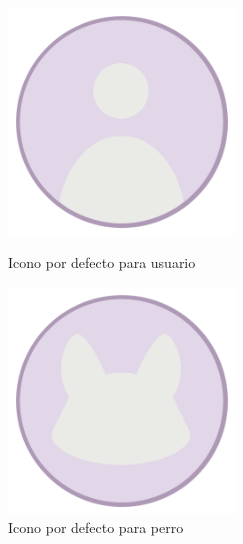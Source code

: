 \documentclass[a4paper, 12pt]{article}
\begin{document}
\begin{figure}[H]
   	\begin{minipage}{0.48\textwidth}
		\begin{center}
			{\includegraphics[width=6cm]{logo/EMPTYUSER.png}\par}
			\caption{Icono por defecto para usuario}
		\end{center}  
	\end{minipage}\hfill
   	\begin{minipage}{0.48\textwidth}
		\begin{center}
			{\includegraphics[width=6cm]{logo/EMPTYDOG.png}\par}
			\caption{Icono por defecto para perro}
		\end{center}  
	\end{minipage}\hfill
\end{figure}
\end{document}

